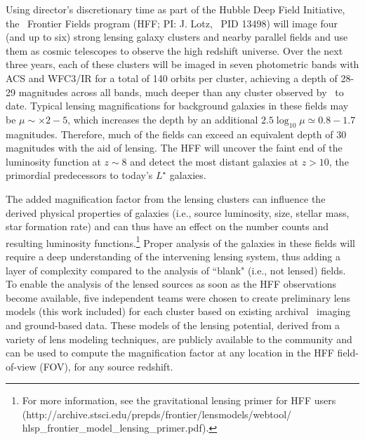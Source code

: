 Using director's discretionary time as part of the Hubble Deep Field Initiative, the \hst\ Frontier Fields program (HFF; PI: J. Lotz, \hst\ PID 13498) will image four (and up to six) strong lensing galaxy clusters and nearby parallel fields and use them as cosmic telescopes to observe the high redshift universe. Over the next three years, each of these clusters will be imaged in seven photometric bands with ACS and WFC3/IR for a total of 140 orbits per cluster, achieving a depth of 28-29 magnitudes across all bands, much deeper than any cluster observed by \hst\ to date. Typical lensing magnifications for background galaxies in these fields may be $\mu\sim\times2-5$, which increases the depth by an additional $2.5\log_{10}\mu\simeq0.8-1.7$ magnitudes. Therefore, much of the fields can exceed an equivalent depth of 30 magnitudes with the aid of lensing. The HFF will uncover the faint end of the luminosity function at $z\sim8$ and detect the most distant galaxies at $z>10$, the primordial predecessors to today's $L^\star$ galaxies.

The added magnification factor from the lensing clusters can influence the derived physical properties of galaxies (i.e., source luminosity, size, stellar mass, star formation rate) and can thus have an effect on the number counts and resulting luminosity functions.\footnote{For more information, see the gravitational lensing primer for HFF users (http://archive.stsci.edu/prepds/frontier/lensmodels/webtool/ hlsp\_frontier\_model\_lensing\_primer.pdf).} Proper analysis of the galaxies in these fields will require a deep understanding of the intervening lensing system, thus adding a layer of complexity compared to the analysis of ``blank" (i.e., not lensed) fields. To enable the analysis of the lensed sources as soon as the HFF observations become available, five independent teams were chosen to create preliminary lens models (this work included) for each cluster based on existing archival \hst\ imaging and ground-based data. These models of the lensing potential, derived from a variety of lens modeling techniques, are publicly available to the community and can be used to compute the magnification factor at any location in the HFF field-of-view (FOV), for any source redshift.

